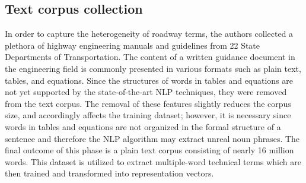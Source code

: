 \documentclass[Journal, BackFigs,NoLists, DoubleSpace]{ascelike}%
\begin{document}
%
%
\subsection{Text corpus collection}
%
In order to capture the heterogeneity of roadway terms, the authors collected a plethora of highway engineering manuals and guidelines from 22 State Departments of Transportation. The content of a written guidance document in the engineering field is commonly presented in various formats such as plain text, tables, and equations. Since the structures of words in tables and equations are not yet supported by the state-of-the-art NLP techniques, they were removed from the text corpus. The removal of these features slightly reduces the corpus size, and accordingly affects the training dataset; however, it is necessary since words in tables and equations are not organized in the formal structure of a sentence and therefore the NLP algorithm may extract unreal noun phrases. The final outcome of this phase is a plain text corpus consisting of nearly 16 million words. This dataset is utilized to extract multiple-word technical terms which are then trained and transformed into representation vectors.
%
\end{document}
